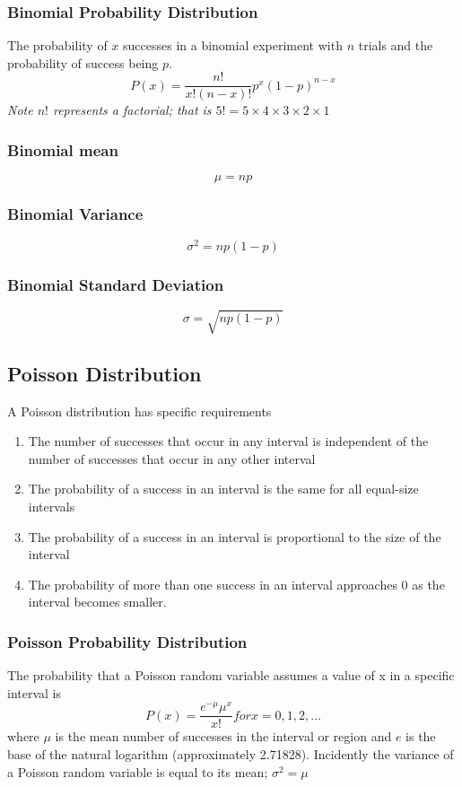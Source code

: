 \documentclass{article}
\begin{document}
\subsubsection{Binomial Probability Distribution}
The probability of $x$ successes in a binomial experiment with $n$ trials and the probability of success being $p$.
\begin{equation}
P(x) = \frac{n!}{x!(n - x)!}p^x(1 - p)^{n-x}
\end{equation}
\textit{Note $n!$ represents a factorial; that is $5! = 5 \times 4 \times 3 \times 2 \times 1$}


\subsubsection{Binomial mean}

$$ \mu = np $$

\subsubsection{Binomial Variance}

$$ \sigma^2 = np(1 - p) $$

\subsubsection{Binomial Standard Deviation}

$$ \sigma = \sqrt{np(1 - p)} $$


\subsection{Poisson Distribution}
A Poisson distribution has specific requirements
\begin{enumerate}
\item The number of successes that occur in any interval is independent of the number of successes that occur in any other interval
\item The probability of a success in an interval is the same for all equal-size intervals
\item The probability of a success in an interval is proportional to the size of the interval
\item The probability of more than one success in an interval approaches 0 as the interval becomes smaller.
\end{enumerate}

\subsubsection{Poisson Probability Distribution}
The probability that a Poisson random variable assumes a value of x in a specific interval is
\begin{equation}
P(x) = \frac{e^{-\mu}\mu^x}{x!} for x = 0,1,2,...
\end{equation}
where $\mu$ is the mean number of successes in the interval or region and $e$ is the base of the natural logarithm (approximately 2.71828). Incidently the variance of a Poisson random variable is equal to its mean; $\sigma^2 = \mu$
\end{document}
